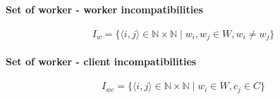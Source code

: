 \documentclass[../../thesis.tex]{subfiles}
\begin{document}
\paragraph{Set of worker - worker incompatibilities}

\begin{equation*}
    {I_{w} = \{ \langle{i},{j}\rangle \in \mathbb{N} \times \mathbb{N} \mid w_i, w_j \in W, w_i \neq w_j \}}
\end{equation*}


\paragraph{Set of worker - client incompatibilities}
\begin{equation*}
    I_{wc} = \{ \langle i, j\rangle \in \mathbb{N} \times \mathbb{N} \mid w_i \in W, c_j \in C \}
\end{equation*}
\end{document}
